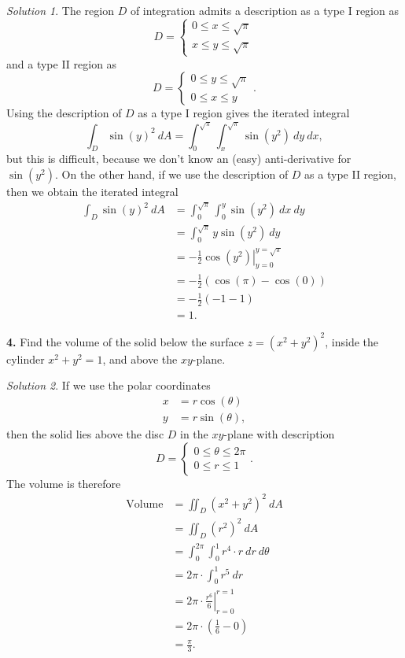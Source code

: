 \documentclass{article}
\theoremstyle{remark}
\newtheorem*{solution}{Solution}
\begin{document}
{\color{blue}
\begin{solution}
The region $D$ of integration admits a description as a type I region as 
\[
D = \begin{cases}
0 \leqslant x \leqslant \sqrt{\pi} \\
x \leqslant y \leqslant \sqrt{\pi}
\end{cases}
\]
and a type II region as 
\[
D = \begin{cases}
0 \leqslant y \leqslant \sqrt{\pi} \\
0 \leqslant x \leqslant y
\end{cases}.
\]
Using the description of $D$ as a type I region gives the iterated integral 
\[
\int_D \sin(y)^2 \: dA = \int_{0}^{\sqrt{\pi}}\int_{x}^{\sqrt{\pi}} \sin(y^2) \: dy \: dx,
\]
but this is difficult, because we don't know an (easy) anti-derivative for $\sin(y^2)$. On the other hand, if we use the description of $D$ as a type II region, then we obtain the iterated integral 
\begin{align*}
\int_D \sin(y)^2 \: dA &= \int_{0}^{\sqrt{\pi}} \int_{0}^{y} \sin(y^2) \: dx \: dy \\
&= \int_{0}^{\sqrt{\pi}} y \sin(y^2) \: dy \\
&= \left.-\frac{1}{2} \cos(y^2)\right|_{y=0}^{y= \sqrt{\pi}} \\
&= -\frac{1}{2}(\cos(\pi) - \cos(0)) \\
&= -\frac{1}{2}(-1 - 1) \\
&= 1. 
\end{align*}
\end{solution}}

\medskip 

\noindent \textbf{4.} Find the volume of the solid below the surface $z = (x^2 + y^2)^2$, inside the cylinder $x^2 + y^2 = 1$, and above the $xy$-plane.  

{\color{blue}
\begin{solution}
If we use the polar coordinates 
\begin{align*}
x &= r\cos(\theta)\\
y &= r\sin(\theta),
\end{align*}
then the solid lies above the disc $D$ in the $xy$-plane with description 
\[
D = \begin{cases}
0 \leqslant \theta \leqslant 2\pi  \\
0 \leqslant r \leqslant 1
\end{cases}.
\] 
The volume is therefore 
\begin{align*}
\text{Volume} &= \iint_D (x^2 + y^2)^2 \: dA \\
&= \iint_D (r^2)^2 \: dA \\
&= \int_{0}^{2\pi}\int_0^1 r^4 \cdot r \: dr \: d\theta \\
&= 2\pi \cdot \int_0^1 r^5 \:dr \\
&= 2\pi \cdot \left.\frac{r^6}{6}\right|_{r=0}^{r=1} \\
&= 2\pi \cdot \left(\frac{1}{6} -0 \right)\\
&= \frac{\pi}{3}. 
\end{align*}
\end{solution}}
\end{document}
